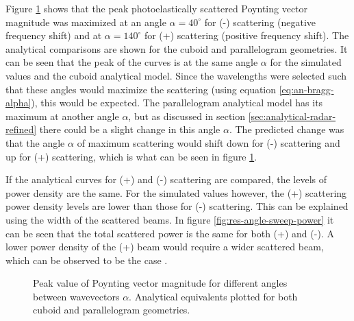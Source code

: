 \documentclass[11pt,twoside]{eitExjobb}
\begin{document}
	Figure \ref{fig:res-angle-sweep-peak} shows that the peak photoelastically scattered Poynting vector magnitude was maximized at an angle $\alpha = 40^\circ$ for (-) scattering (negative frequency shift) and at $\alpha = 140^\circ$ for (+) scattering (positive frequency shift). The analytical comparisons are shown for the cuboid and parallelogram geometries. It can be seen that the peak of the curves is at the same angle $\alpha$ for the simulated values and the cuboid analytical model. Since the wavelengths were selected such that these angles would maximize the scattering (using equation \eqref{eq:an-bragg-alpha}), this would be expected. The parallelogram analytical model has its maximum at another angle $\alpha$, but as discussed in section \ref{sec:analytical-radar-refined} there could be a slight change in this angle $\alpha$. The predicted change was that the angle $\alpha$ of maximum scattering would shift down for (-) scattering and up for (+) scattering, which is what can be seen in figure \ref{fig:res-angle-sweep-peak}.
	
	If the analytical curves for (+) and (-) scattering are compared, the levels of power density are the same. For the simulated values however, the (+) scattering power density levels are lower than those for (-) scattering. This can be explained using the width of the scattered beams. In figure \ref{fig:res-angle-sweep-power} it can be seen that the total scattered power is the same for both (+) and (-). A lower power density of the (+) beam would require a wider scattered beam, which can be observed to be the case .
	
	\begin{figure}[H]
		\centering
		\begin{subfigure}{\textwidth}
			\resizebox{\textwidth}{!}{
				
			}
		\end{subfigure}
		\begin{subfigure}{\textwidth}
			\resizebox{\textwidth}{!}{
				
			}
		\end{subfigure}
		\caption{\label{fig:res-angle-sweep-peak} Peak value of Poynting vector magnitude for different angles between wavevectors $\alpha$. Analytical equivalents plotted for both cuboid and parallelogram geometries.}
	\end{figure}
	
\end{document}
